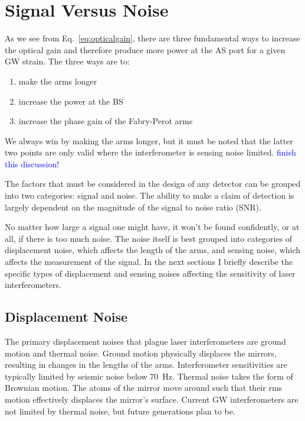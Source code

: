 \section{Signal Versus Noise} 
As we see from Eq.~\ref{eq:opticalgain}, there are three fundamental
ways to increase the optical gain and therefore produce more power at
the AS port for a given GW strain. The three ways are to:
\begin{enumerate}
\item make the arms longer \vspace{-10 pt}
\item increase the power at the BS \vspace{-10 pt}
\item increase the phase gain of the Fabry-Perot arms
\end{enumerate}
We always win by making the arms longer, but it must be noted that the
latter two points are only valid where the interferometer is sensing
noise limited. \textcolor{blue}{finish this discussion!}

The factors that must be considered in the design of any detector can
be grouped into two categories: signal and noise. The ability to make
a claim of detection is largely dependent on the magnitude of the
signal to noise ratio (SNR). 

No matter how large a signal one might have, it won't be found
confidently, or at all, if there is too much noise. The noise itself
is best grouped into categories of displacement noise, which affects
the length of the arms, and sensing noise, which affects the
measurement of the signal. In the next sections I briefly describe the
specific types of displacement and sensing noises affecting the
sensitivity of laser interferometers.




\subsection{Displacement Noise} 
The primary displacement noises that plague laser interferometers are
ground motion and thermal noise. Ground motion physically displaces
the mirrors, resulting in changes in the lengths of the
arms. Interferometer sensitivities are typically limited by seismic noise below
70~Hz. Thermal noise takes the form of Brownian motion. The atoms of
the mirror move around such that their rms motion effectively
displaces the mirror's surface. Current GW interferometers are not
limited by thermal noise, but future generations plan to be. 



